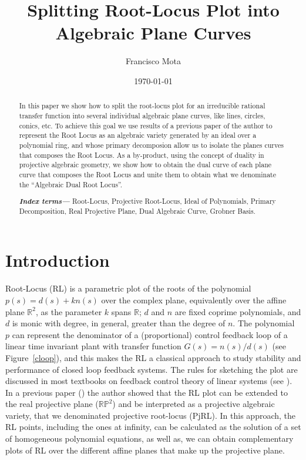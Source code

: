 \documentclass{article}
\author{Francisco Mota}
\affil{Departamento de Engenharia de Computa\c c\~ao e Automa\c c\~ao\\
Universidade Federal do Rio Grande do Norte -- Brasil\\
e-mail:mota@dca.ufrn.br}
\date{\today}
\title{Splitting Root-Locus Plot into Algebraic Plane Curves}
\providecommand{\keywords}[1]{\textbf{\textit{Index terms---}} #1}
\begin{document}
\maketitle

  
  
 
\begin{abstract}
In this paper we show how to split the root-locus plot for an irreducible rational transfer function
into several individual algebraic plane curves, like lines, circles, conics, etc. To achieve this goal we
use results of a previous paper of the author to represent the Root Locus as an algebraic 
variety generated by an ideal
over a polynomial ring, and whose primary decomposion allow us to isolate the planes curves that 
composes the Root Locus. As a by-product, using the concept of duality in projective algebraic geometry,
we show how to obtain the dual curve of each plane curve that composes the Root Locus and 
unite them to obtain what we denominate the ``Algebraic Dual Root Locus''.

\keywords{Root-Locus, Projective Root-Locus, Ideal of Polynomials, Primary Decomposition, 
Real Projective Plane, Dual Algebraic Curve, Grobner Basis.}


\end{abstract}

\section{Introduction}

Root-Locus (RL) is a  parametric plot of the roots of the polynomial
$p(s) = d(s) + kn(s)$  over the complex plane, equivalently over the affine plane $\mathbb{R}^2$,
as the parameter $k$ spans $\mathbb{R}$; $d$ and $n$
are fixed coprime polynomials, and $d$ is monic with degree, in general, greater
than the degree of $n$. The polynomial $p$ can represent the denominator of a (proportional) control
feedback loop of a  linear time invariant plant  with transfer function $G(s)=n(s)/d(s)$ (see Figure~\ref{cloop}), 
and this makes  the RL a classical approach to study stability and performance of 
closed loop feedback systems. The rules for sketching the plot are discussed in most textbooks on 
feedback control theory of linear systems (see \cite{dh}).
In a previous paper (\cite{pjrl}) the author showed that the RL plot can be extended 
to the  real projective plane ($\mathbb{RP}^2$) and be interpreted as a projective algebraic 
variety, that we denominated projective root-locus (PjRL). 
In this approach, the RL points, including the ones at infinity, 
can be calculated as the solution of a set of homogeneous polynomial equations, 
as well as, we can obtain complementary 
plots of RL over the different affine planes that make up the projective plane.
\end{document}
